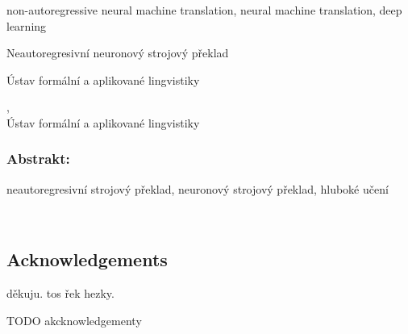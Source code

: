 \documentclass[12pt,notitlepage,a4paper,openright]{report}
\begin{document}


\begin{description}[leftmargin=7.5em,labelwidth=7em,labelindent=0em,labelsep=0.5em]
\item[Keywords:] non-autoregressive neural machine translation, neural machine translation, deep learning
\end{description}


\cleardoublepage{}
\begin{description}[leftmargin=7.5em,labelwidth=7em,labelindent=0em,labelsep=0.5em]
\item[Název práce:] Neautoregresivní neuronový strojový překlad
\item[Autor:] \theauthor{}
\item[Katedra:] Ústav formální a aplikované lingvistiky
\item[Vedoucí práce:] \thesupervisor,\\ Ústav formální a aplikované lingvistiky
\end{description}

\subsubsection{Abstrakt:}



\begin{description}[leftmargin=7.5em,labelwidth=7em,labelindent=0em,labelsep=0.5em]
%
\item[Klíčová slova:] neautoregresivní strojový překlad, neuronový strojový překlad, hluboké učení
%
\end{description}





\cleardoublepage{}
\ \vspace{10mm}

\subsection*{Acknowledgements}

{
  děkuju. tos řek hezky.
}

\vfill


{\noindent\footnotesize TODO akcknowledgementy}

\cleardoublepage{}
\tableofcontents %
\end{document}
